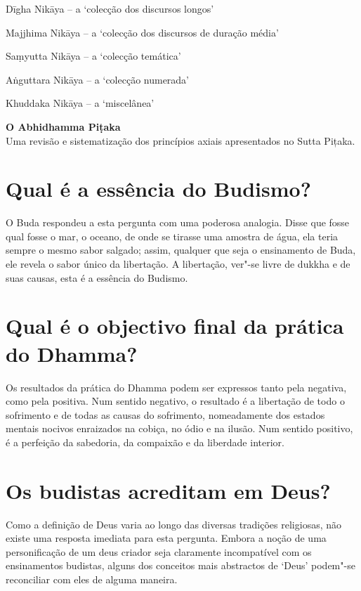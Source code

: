 \begin{packeditemize}
\item Dīgha Nikāya -- a `colecção dos discursos longos'
\item Majjhima Nikāya -- a `colecção dos discursos de duração média'
\item Saṃyutta Nikāya -- a `colecção temática'
\item Aṅguttara Nikāya -- a `colecção numerada'
\item Khuddaka Nikāya -- a `miscelânea'
\end{packeditemize}

\textbf{O Abhidhamma Piṭaka}\\
Uma revisão e sistematização dos princípios axiais apresentados no Sutta
Pițaka.

\section{Qual é a essência do Budismo?}

O Buda respondeu a esta pergunta com uma poderosa analogia. Disse que
fosse qual fosse o mar, o oceano, de onde se tirasse uma amostra de
água, ela teria sempre o mesmo sabor salgado; assim, qualquer que seja o
ensinamento de Buda, ele revela o sabor único da libertação. A
libertação, ver"-se livre de dukkha e de suas causas, esta é a essência
do Budismo.

\section{Qual é o objectivo final da prática do Dhamma?}

Os resultados da prática do Dhamma podem ser expressos tanto pela
negativa, como pela positiva. Num sentido negativo, o resultado é a
libertação de todo o sofrimento e de todas as causas do sofrimento,
nomeadamente dos estados mentais nocivos enraizados na cobiça, no ódio e
na ilusão. Num sentido positivo, é a perfeição da sabedoria, da
compaixão e da liberdade interior.

\section{Os budistas acreditam em Deus?}

Como a definição de Deus varia ao longo das diversas tradições
religiosas, não existe uma resposta imediata para esta pergunta. Embora
a noção de uma personificação de um deus criador seja claramente
incompatível com os ensinamentos budistas, alguns dos conceitos mais
abstractos de `Deus' podem"-se reconciliar com eles de alguma maneira.

